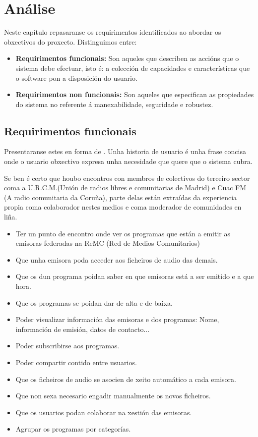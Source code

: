 \chapter[Análise]{
  \label{chp:analise}
  Análise
}
\minitoc
\newpage

Neste capítulo repasaranse os requirimentos identificados ao abordar os obxectivos do proxecto. Distinguimos entre:

\begin{itemize}
	\item \textbf{Requirimentos funcionais:} Son aqueles que describen as accións que o sistema debe efectuar, isto é: a colección de capacidades e características que o software pon a disposición do usuario.
	\item \textbf{Requirimentos non funcionais:} Son aqueles que especifican as propiedades do sistema no referente á manexabilidade, seguridade e robustez\cite{softreq}.
\end{itemize}

\section{Requirimentos funcionais}

Presentaranse estes en forma de . Unha historia de usuario é unha frase concisa onde o usuario obxectivo expresa unha necesidade que quere que o sistema cubra.

Se ben é certo que houbo encontros con membros de colectivos do terceiro sector coma a U.R.C.M.(Unión de radios libres e comunitarias de Madrid) e Cuac FM (A radio comunitaria da Coruña), parte delas están extraídas da experiencia propia coma colaborador nestes medios e coma moderador de comunidades en liña.


\begin{itemize}
	\item Ter un punto de encontro onde ver os programas que están a emitir as emisoras federadas na ReMC (Red de Medios Comunitarios)
	\item Que unha emisora poda acceder aos ficheiros de audio das demais.
	\item Que os  dun programa poidan saber en que emisoras está a ser emitido e a que hora.
	\item Que os programas se poidan dar de alta e de baixa.
	\item Poder visualizar información das emisoras e dos programas: Nome, información de emisión, datos de contacto...
	\item Poder subscribirse aos programas.
	\item Poder compartir contido entre usuarios.
	\item Que os ficheiros de audio se asocien de xeito automático a cada emisora.
	\item Que non sexa necesario engadir manualmente os novos ficheiros.
	\item Que os usuarios podan colaborar na xestión das emisoras.
	\item Agrupar os programas por categorías.
\end{itemize}

